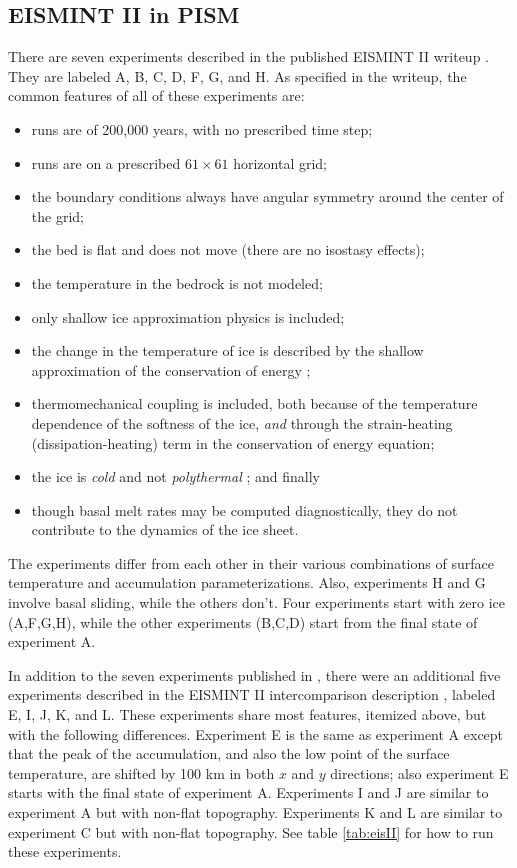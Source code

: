 \documentclass[11pt,final]{amsart}
\begin{document}
\subsection{EISMINT II in PISM}  There are seven experiments described in the published EISMINT II writeup \cite{EISMINT00}.  They are labeled A, B, C, D, F, G, and H.  As specified in the writeup, the common features of all of these experiments are:\begin{itemize}
\item runs are of 200,000 years, with no prescribed time step;
\item runs are on a prescribed $61\times 61$ horizontal grid;
\item the boundary conditions always have angular symmetry around the center of the grid;
\item the bed is flat and does not move (there are no isostasy effects);
\item the temperature in the bedrock is not modeled;
\item only shallow ice approximation physics is included;
\item the change in the temperature of ice is described by the shallow approximation of the conservation of energy \cite{Fowler};
\item thermomechanical coupling is included, both because of the temperature dependence of the softness of the ice, \emph{and} through the strain-heating (dissipation-heating) term in the conservation of energy equation;
\item the ice is \emph{cold} and not \emph{polythermal} \cite{Greve}; and finally
\item though basal melt rates may be computed diagnostically, they do not contribute to the dynamics of the ice sheet.
\end{itemize}
The experiments differ from each other in their various combinations of surface temperature and accumulation parameterizations.  Also, experiments H and G involve basal sliding, while the others don't.  Four experiments start with zero ice (A,F,G,H), while the other experiments (B,C,D) start from the final state of experiment A.

In addition to the seven experiments published in \cite{EISMINT00}, there were an additional five experiments described in the EISMINT II intercomparison description 
\cite{EISIIdescribe}, labeled E, I, J, K, and L.  These experiments share most features, itemized above, but with the following differences.  Experiment E is the same as experiment A except that the peak of the accumulation, and also the low point of the surface temperature, are shifted by 100 km in both $x$ and $y$ directions; also experiment E starts with the final state of experiment A.  Experiments I and J are similar to experiment A but with non-flat topography.  Experiments K and L are similar to experiment C but with non-flat topography.  See table \ref{tab:eisII} for how to run these experiments.
\end{document}

